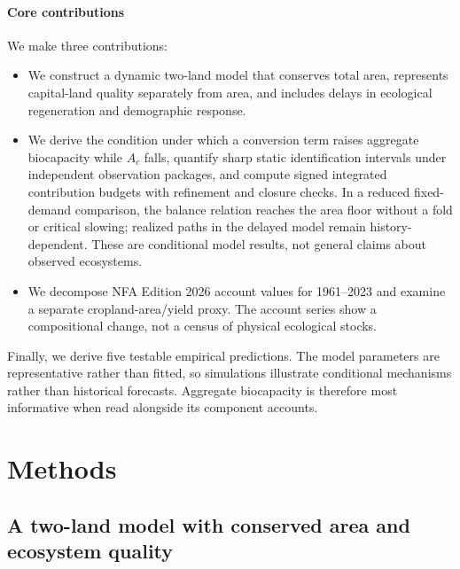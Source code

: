 \documentclass[preprint,12pt,authoryear]{elsarticle}
\begin{document}
\paragraph{Core contributions} We make three contributions:
\begin{itemize}
  \item We construct a dynamic two-land model that conserves total area, represents capital-land quality separately from area, and includes delays in ecological regeneration and demographic response.
  \item We derive the condition under which a conversion term raises aggregate biocapacity while $A_c$ falls, quantify sharp static identification intervals under independent observation packages, and compute signed integrated contribution budgets with refinement and closure checks. In a reduced fixed-demand comparison, the balance relation reaches the area floor without a fold or critical slowing; realized paths in the delayed model remain history-dependent. These are conditional model results, not general claims about observed ecosystems.
  \item We decompose NFA Edition 2026 account values for 1961--2023 and examine a separate cropland-area/yield proxy. The account series show a compositional change, not a census of physical ecological stocks.
\end{itemize}

Finally, we derive five testable empirical predictions. The model parameters are representative rather than fitted, so simulations illustrate conditional mechanisms rather than historical forecasts. Aggregate biocapacity is therefore most informative when read alongside its component accounts.

\section{Methods}\label{sec:model}

\subsection{A two-land model with conserved area and ecosystem quality}\label{sec:equations}
\end{document}
